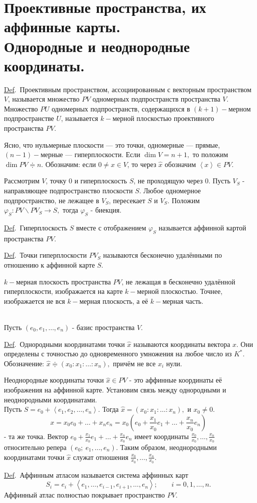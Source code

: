 \documentclass[a4paper]{article}%
\renewcommand{\de}{\par\noindent\underline{Def}.\ }%
\renewcommand{\ab}{\par\noindent}%
\renewcommand{\phi}{\varphi}
\renewcommand{\nn}[1]{#1_1,#1_2,\dots,#1_n}%
\newcommand{\lob}[1]{\left\langle#1\right\rangle}%
\newcommand{\we}[1]{\widehat{#1}}
\begin{document}
\section{Проективные пространства, их аффинные карты.\\ Однородные и неоднородные координаты.}
\label{q51}
\de Проективным пространством, ассоциированным с векторным пространством $V$, называется множество $PV$ одномерных
подпространств пространства $V$. Множество $PU$ одномерных подпространств, содержащихся в $(k+1)-$мерном подпространстве
$U$, называется $k-$мерной плоскостью проективного пространства $PV.$
\ab Ясно, что нульмерные плоскости --- это точки, одномерные --- прямые, $(n-1)-$мерные --- гиперплоскости.
Если $\dim V=n+1,$ то положим $\dim PV\doteqdot n.$ Обозначим: если $0\ne x\in V$, то через $\we{x}$ обозначим $\lob{x}\in PV.$
\ab Рассмотрим $V$, точку $0$ и гиперплоскость $S$, не проходящую через 0. Пусть $V_S$ - направляющее подпространство
плоскости $S$. Любое одномерное подпространство, не лежащее в $V_S$, пересекает $S$ и $V_S$. Положим $\phi_S: PV\backslash PV_S\rightarrow S,$
тогда $\phi_S$ - биекция.
\de Гиперплоскость $S$ вместе с отображением $\phi_S$ называется аффинной картой пространства $PV.$
\de Точки гиперплоскости $PV_S$ называются бесконечно удалёнными по отношению к аффинной карте $S$.
\ab $k-$мерная плоскость пространства $PV$, не лежащая в бесконечно удалённой гиперплоскости, изображается на
карте $k-$мерной плоскостью. Точнее, изображается не вся $k-$мерная плоскость, а её $k-$мерная часть.
\ab\\ Пусть $(e_0,e_1,\dots,e_n)$ - базис пространства $V$.
\de Однородными координатами точки $\we{x}$ называются координаты вектора $x$. Они определены с точностью до одновременного
умножения на любое число из $K^*.$ Обозначение: $\we{x}\doteqdot (x_0:x_1:\dots:x_n),$
причём не все $x_i$ нули. \ab Неоднородные координаты точки $\we{x}\in PV$ - это аффинные координаты её изображения на
аффинной карте. Установим связь между однородными и неоднородными координатами.\\Пусть $S=e_0+\lob{\nn{e}}.$ Тогда
$\we{x}=(x_0:x_1:\dots:x_n),$ и $x_0\ne 0.$ $$x=x_0e_0+\dots+x_ne_n=x_0\left(e_0+\frac{\displaystyle x_1}{\displaystyle x_0}e_1+\dots+\frac{\displaystyle x_n}{\displaystyle x_0}e_n\right)$$
- та же точка. Вектор $e_0+\frac{\displaystyle x_1}{\displaystyle x_0}e_1+\dots+\frac{\displaystyle x_n}{\displaystyle x_0}e_n$
имеет координаты $\frac{\displaystyle x_0}{\displaystyle x_0},\dots,\frac{\displaystyle x_n}{\displaystyle x_0}$ относительно
репера $(e_0;\ e_1,\dots,e_n).$ Таким образом, неоднородными координатами точки $\we{x}$ служат отношения $\frac{\displaystyle x_0}{\displaystyle x_0},\dots,\frac{\displaystyle x_n}{\displaystyle x_0}.$
\de Аффинным атласом называется система аффинных карт $$S_i=e_i+\lob{e_1,\dots,e_{i-1},e_{i+1},\dots,e_n};\qquad i=0,1,\dots,n.$$
Аффинный атлас полностью покрывает пространство $PV.$
\end{document}
